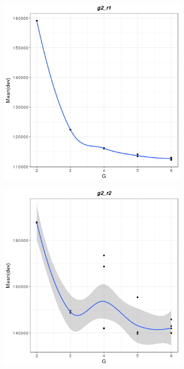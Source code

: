 \documentclass{spbau-diploma}
\begin{document}
\begin{figure}
    \centering
    \begin{subfigure}[b]{0.3\textwidth}
        \includegraphics[width=\textwidth]{pics/devs/g2_r1.png}
    \end{subfigure}
    \qquad
    \begin{subfigure}[b]{0.3\textwidth}
        \includegraphics[width=\textwidth]{pics/devs/g2_r2.png}
    \end{subfigure}
      

\end{figure}
\end{document}
